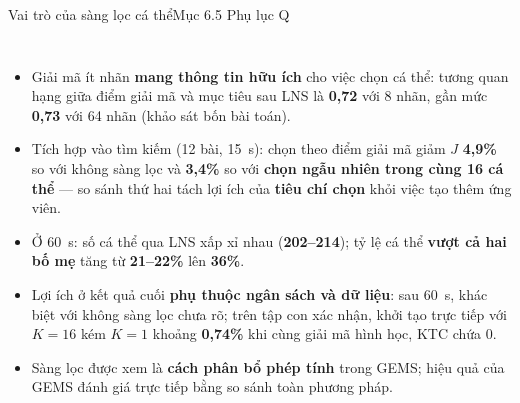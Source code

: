 \documentclass[aspectratio=169,10pt,t,xcolor={table}]{beamer}
\newcommand{\src}[1]{\hfill{\normalfont\footnotesize\color{white!62!navy}#1}}  %
\begin{document}
\begin{frame}[label=figforest]{Vai trò của sàng lọc cá thể\src{Mục 6.5 \textperiodcentered{} Phụ lục Q}}
\begin{columns}[T,onlytextwidth]
\begin{itemize}\scriptsize
\item Giải mã ít nhãn \textbf{mang thông tin hữu ích} cho việc chọn cá thể: tương quan hạng giữa điểm giải mã và mục tiêu sau LNS là \textbf{0,72} với 8 nhãn, gần mức \textbf{0,73} với 64 nhãn (khảo sát bốn bài toán).
\item Tích hợp vào tìm kiếm (12 bài, 15~s): chọn theo điểm giải mã giảm $J$ \textbf{4,9\%} so với không sàng lọc và \textbf{3,4\%} so với \textbf{chọn ngẫu nhiên trong cùng 16 cá thể} --- so sánh thứ hai tách lợi ích của \textbf{tiêu chí chọn} khỏi việc tạo thêm ứng viên.
\item Ở 60~s: số cá thể qua LNS xấp xỉ nhau (\textbf{202--214}); tỷ lệ cá thể \textbf{vượt cả hai bố mẹ} tăng từ \textbf{21--22\%} lên \textbf{36\%}.
\item Lợi ích ở kết quả cuối \textbf{phụ thuộc ngân sách và dữ liệu}: sau 60~s, khác biệt với không sàng lọc chưa rõ; trên tập con xác nhận, khởi tạo trực tiếp với $K=16$ kém $K=1$ khoảng \textbf{0,74\%} khi cùng giải mã hình học, KTC chứa 0.
\item[$\Rightarrow$] Sàng lọc được xem là \textbf{cách phân bổ phép tính} trong GEMS; hiệu quả của GEMS đánh giá trực tiếp bằng so sánh toàn phương pháp.
\end{itemize}
\centering
{}
\end{columns}
\end{frame}
\end{document}
